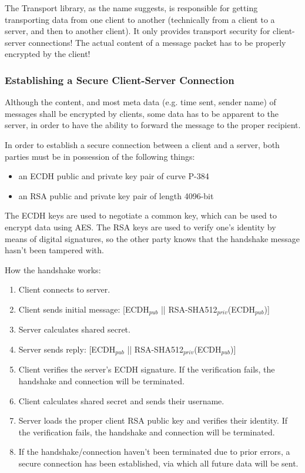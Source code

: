 The Transport library, as the name suggests, is responsible for getting transporting data from one client to another (technically from a client to a server, and then to another client).
It only provides transport security for client-server connections!
The actual content of a message packet has to be properly encrypted by the client!

\subsubsection{Establishing a Secure Client-Server Connection}
Although the content, and most meta data (e.g. time sent, sender name) of messages shall be encrypted by clients, some data has to be apparent to the server, in order to have the ability to forward the message to the proper recipient.

In order to establish a secure connection between a client and a server, both parties must be in possession of the following things:
\begin{itemize}
  \setlength\itemsep{-.5em}
  \item an \ac{ECDH} public and private key pair of curve P-384 \parencite{nist-digital-signature-standard}
  \item an RSA public and private key pair of length 4096-bit
\end{itemize}

The \ac{ECDH} keys are used to negotiate a common key, which can be used to encrypt data using AES.
The RSA keys are used to verify one's identity by means of digital signatures, so the other party knows that the handshake message hasn't been tampered with.

How the handshake works:
\vspace{-.75em}
\begin{enumerate}
  \setlength\itemsep{-.5em}
  \item Client connects to server.
  \item Client sends initial message: [\ac{ECDH}$_{pub}$ || RSA-SHA512$_{priv}$(\ac{ECDH}$_{pub}$)]
  \item Server calculates shared secret.
  \item Server sends reply: [\ac{ECDH}$_{pub}$ || RSA-SHA512$_{priv}$(\ac{ECDH}$_{pub}$)]
  \item Client verifies the server's \ac{ECDH} signature. If the verification fails, the handshake and connection will be terminated.
  \item Client calculates shared secret and sends their username.
  \item Server loads the proper client RSA public key and verifies their identity. If the verification fails, the handshake and connection will be terminated.
  \item If the handshake/connection haven't been terminated due to prior errors, a secure connection has been established, via which all future data will be sent.
\end{enumerate}

